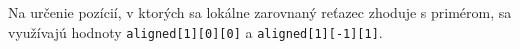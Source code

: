 Na určenie pozícií, v ktorých sa lokálne zarovnaný reťazec zhoduje s primérom, sa využívajú hodnoty \texttt{aligned[1][0][0]} a \texttt{aligned[1][-1][1]}.

